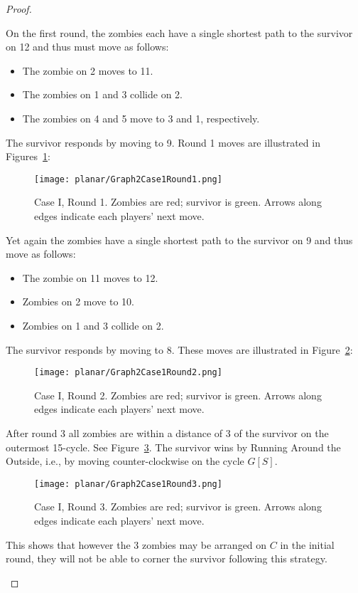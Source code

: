\begin{proof}
\begin{enumerate}[I.]
On the first round, the zombies each have a single shortest path to the survivor on 12 and thus must move as follows:

\begin{itemize}
\item The zombie on 2 moves to 11.
\item The zombies on 1 and 3 collide on 2.
\item The zombies on 4 and 5 move to 3 and 1, respectively.
\end{itemize}

The survivor responds by moving to 9. Round 1 moves are illustrated in Figures~\ref{fig:planarG2C1R1}:
\begin{figure}
\centering
\texttt{[image: planar/Graph2Case1Round1.png]}
\caption{Case I, Round 1. Zombies are red; survivor is green. Arrows along edges indicate each players' next move.\label{fig:planarG2C1R1}}
\end{figure}

Yet again the zombies have a single shortest path to the survivor on 9 and thus move as follows:
\begin{itemize}
\item The zombie on 11 moves to 12.
\item Zombies on 2 move to 10.
\item Zombies on 1 and 3 collide on 2.
\end{itemize}

The survivor responds by moving to 8. These moves are illustrated in Figure~\ref{fig:planarG2C1R2}:
\begin{figure}
\centering
\texttt{[image: planar/Graph2Case1Round2.png]}
\caption{Case I, Round 2. Zombies are red; survivor is green. Arrows along edges indicate each players' next move.\label{fig:planarG2C1R2}}
\end{figure}

After round 3 all zombies are within a distance of 3 of the survivor on the outermost 15-cycle. See Figure~\ref{fig:planarG2C1R3}. The survivor wins by Running Around the Outside, i.e., by moving counter-clockwise on the cycle $G[S]$.

\begin{figure}
\centering
\texttt{[image: planar/Graph2Case1Round3.png]}
\caption{Case I, Round 3. Zombies are red; survivor is green. Arrows along edges indicate each players' next move.\label{fig:planarG2C1R3}}
\end{figure}

This shows that however the 3 zombies may be arranged on $C$ in the initial round, they will not be able to corner the survivor following this strategy.


\end{enumerate}
\end{proof}
